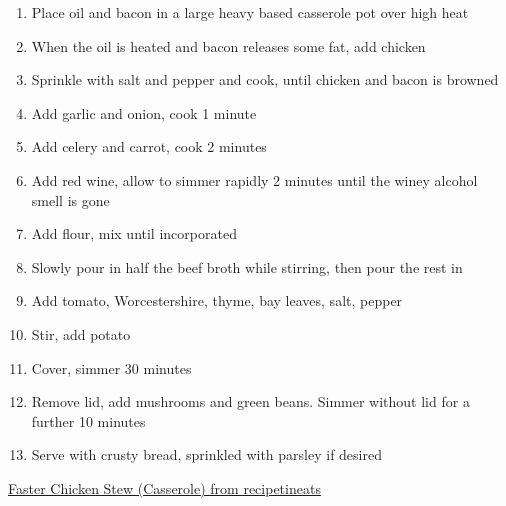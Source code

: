 \documentclass[11pt,a4paper]{article}
\begin{document}
\begin{enumerate}
  \item Place oil and bacon in a large heavy based casserole pot over high heat
  \item When the oil is heated and bacon releases some fat, add chicken
  \item Sprinkle with salt and pepper and cook, until chicken and bacon is browned
  \item Add garlic and onion, cook 1 minute
  \item Add celery and carrot, cook 2 minutes
  \item Add red wine, allow to simmer rapidly 2 minutes until the winey alcohol smell is gone
  \item Add flour, mix until incorporated
  \item Slowly pour in half the beef broth while stirring, then pour the rest in
  \item Add tomato, Worcestershire, thyme, bay leaves, salt, pepper
  \item Stir, add potato
  \item Cover, simmer 30 minutes
  \item Remove lid, add mushrooms and green beans. Simmer without lid for a further 10 minutes
  \item Serve with crusty bread, sprinkled with parsley if desired
\end{enumerate}

\href{https://www.recipetineats.com/chicken-stew-casserole/}{Faster Chicken Stew (Casserole) from recipetineats}
\end{document}
